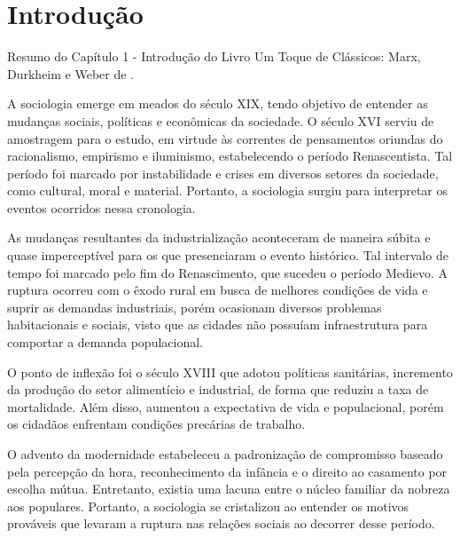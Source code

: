 \section{Introdução}

Resumo do Capítulo 1 - Introdução do Livro Um Toque de Clássicos: Marx, Durkheim e Weber de .


A sociologia emerge em meados do século XIX, tendo objetivo de entender as mudanças sociais, políticas e econômicas da sociedade.
O século XVI serviu de amostragem para o estudo, em virtude às correntes de pensamentos oriundas do racionalismo, empirismo e iluminismo, estabelecendo o período Renascentista.
Tal período foi marcado por instabilidade e crises em diversos setores da sociedade, como cultural, moral e material.
Portanto, a sociologia surgiu para interpretar os eventos ocorridos nessa cronologia.




As mudanças resultantes da industrialização aconteceram de maneira súbita e quase imperceptível para os que presenciaram o evento histórico.
Tal intervalo de tempo foi marcado pelo fim do Renascimento, que sucedeu o período Medievo.
A ruptura ocorreu com o êxodo rural em busca de melhores condições de vida e suprir as demandas industriais, porém ocasionam diversos problemas habitacionais e sociais, visto que as cidades não possuíam infraestrutura para comportar a demanda populacional.

O ponto de inflexão foi o século XVIII que adotou políticas sanitárias, incremento da produção do setor alimentício e industrial, de forma que reduziu a taxa de mortalidade. 
Além disso, aumentou a expectativa de vida e populacional, porém os cidadãos enfrentam condições precárias de trabalho.

O advento da modernidade estabeleceu a padronização de compromisso baseado pela percepção da hora, reconhecimento da infância e o direito ao casamento por escolha mútua.
Entretanto, existia uma lacuna entre o núcleo familiar da nobreza aos populares.
Portanto, a sociologia se cristalizou ao entender os motivos prováveis que levaram a ruptura nas relações sociais ao decorrer desse período.




